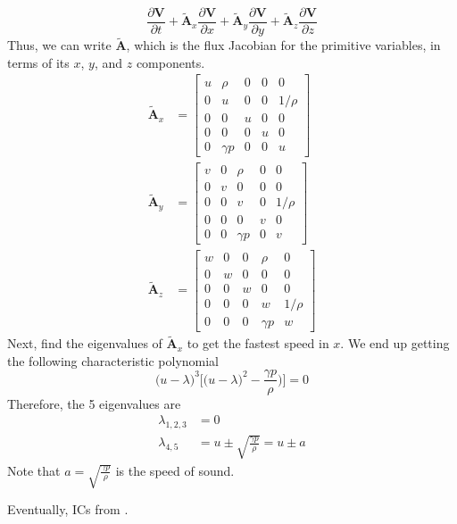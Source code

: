 \documentclass{report}
\begin{document}
\begin{equation} %
	\frac{\partial \mathbf{V}}{\partial t} + \tilde{\mathbf{A}}_x \frac{\partial \mathbf{V}}{\partial x} + \tilde{\mathbf{A}}_y \frac{\partial \mathbf{V}}{\partial y} + \tilde{\mathbf{A}}_z \frac{\partial \mathbf{V}}{\partial z}
\end{equation}
Thus, we can write $\tilde{\mathbf{A}}$, which is the flux Jacobian for the primitive variables, in terms of its $x$, $y$, and $z$ components.
\begin{align}
	\tilde{\mathbf{A}}_x &= \begin{bmatrix}
		u & \rho & 0 & 0 & 0 \\
		0 & u & 0 & 0 & 1/\rho \\
		0 & 0 & u & 0 & 0 \\
		0 & 0 & 0 & u & 0 \\
		0 & \gamma p & 0 & 0 & u
	\end{bmatrix} \\
	\tilde{\mathbf{A}}_y &= \begin{bmatrix}
		v & 0 & \rho & 0 & 0 \\
		0 & v & 0 & 0 & 0 \\
		0 & 0 & v & 0 & 1/\rho \\
		0 & 0 & 0 & v & 0 \\
		0 & 0 & \gamma p & 0 & v
	\end{bmatrix} \\
	\tilde{\mathbf{A}}_z &= \begin{bmatrix}
		w & 0 & 0 & \rho & 0 \\
		0 & w & 0 & 0 & 0 \\
		0 & 0 & w & 0 & 0 \\
		0 & 0 & 0 & w & 1/\rho \\
		0 & 0 & 0 & \gamma p & w
	\end{bmatrix}
\end{align}
Next, find the eigenvalues of $\tilde{\mathbf{A}}_x$ to get the fastest speed in $x$.
We end up getting the following characteristic polynomial
\begin{equation}
	\big(u - \lambda\big)^3 \bigg[ \big( u - \lambda \big)^2 - \frac{\gamma p}{\rho} \big) \bigg] = 0
\end{equation}
Therefore, the 5 eigenvalues are
\begin{align}
	\lambda_{1,2,3} &= 0 \\
	\lambda_{4,5} &= u \pm \sqrt{\frac{\gamma p}{\rho}} = u \pm a
\end{align}
Note that $a=\sqrt{\frac{\gamma p}{\rho}}$ is the speed of sound.



Eventually, ICs from \cite{sod1978survey}.









	
\end{document}
